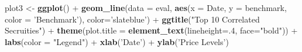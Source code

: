 \documentclass[]{elsarticle} %
\newenvironment{Shaded}{\begin{snugshade}}{\end{snugshade}}
\newcommand{\KeywordTok}[1]{\textcolor[rgb]{0.13,0.29,0.53}{\textbf{{#1}}}}
\newcommand{\DataTypeTok}[1]{\textcolor[rgb]{0.13,0.29,0.53}{{#1}}}
\newcommand{\DecValTok}[1]{\textcolor[rgb]{0.00,0.00,0.81}{{#1}}}
\newcommand{\StringTok}[1]{\textcolor[rgb]{0.31,0.60,0.02}{{#1}}}
\newcommand{\NormalTok}[1]{{#1}}
\begin{document}
\begin{Shaded}
\begin{Highlighting}[]
\NormalTok{plot3 <-}\StringTok{ }\KeywordTok{ggplot}\NormalTok{() +}\StringTok{ }\KeywordTok{geom_line}\NormalTok{(}\DataTypeTok{data =} \NormalTok{eval, }\KeywordTok{aes}\NormalTok{(}\DataTypeTok{x =} \NormalTok{Date, }\DataTypeTok{y =} \NormalTok{benchmark, }
                                    \DataTypeTok{color =} \StringTok{'Benchmark'}\NormalTok{), }\DataTypeTok{color=}\StringTok{'slateblue'}\NormalTok{) +}
\StringTok{                }\KeywordTok{ggtitle}\NormalTok{(}\StringTok{"Top 10 Correlated Secruities"}\NormalTok{) +}\StringTok{ }
\StringTok{                            }\KeywordTok{theme}\NormalTok{(}\DataTypeTok{plot.title =} \KeywordTok{element_text}\NormalTok{(}\DataTypeTok{lineheight=}\NormalTok{.}\DecValTok{4}\NormalTok{, }\DataTypeTok{face=}\StringTok{"bold"}\NormalTok{)) +}
\StringTok{                }\KeywordTok{labs}\NormalTok{(}\DataTypeTok{color =} \StringTok{"Legend"}\NormalTok{) +}
\StringTok{                }\KeywordTok{xlab}\NormalTok{(}\StringTok{'Date'}\NormalTok{) +}
\StringTok{                }\KeywordTok{ylab}\NormalTok{(}\StringTok{'Price Levels'}\NormalTok{)}
\end{Highlighting}
\end{Shaded}
\end{document}
